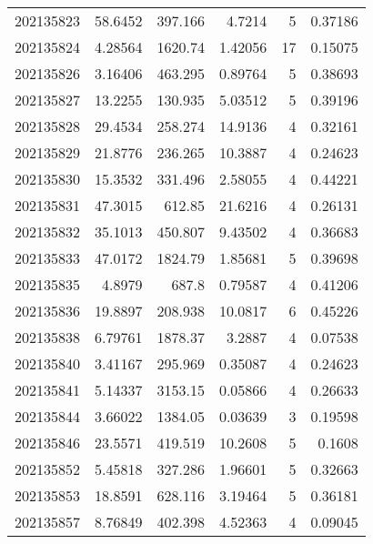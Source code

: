 \begin{tabular}{rrrrrr}
 202135823 &         58.6452  &      397.166  &            4.7214  &           5 & 0.37186 \\
 202135824 &          4.28564 &     1620.74   &            1.42056 &          17 & 0.15075 \\
 202135826 &          3.16406 &      463.295  &            0.89764 &           5 & 0.38693 \\
 202135827 &         13.2255  &      130.935  &            5.03512 &           5 & 0.39196 \\
 202135828 &         29.4534  &      258.274  &           14.9136  &           4 & 0.32161 \\
 202135829 &         21.8776  &      236.265  &           10.3887  &           4 & 0.24623 \\
 202135830 &         15.3532  &      331.496  &            2.58055 &           4 & 0.44221 \\
 202135831 &         47.3015  &      612.85   &           21.6216  &           4 & 0.26131 \\
 202135832 &         35.1013  &      450.807  &            9.43502 &           4 & 0.36683 \\
 202135833 &         47.0172  &     1824.79   &            1.85681 &           5 & 0.39698 \\
 202135835 &          4.8979  &      687.8    &            0.79587 &           4 & 0.41206 \\
 202135836 &         19.8897  &      208.938  &           10.0817  &           6 & 0.45226 \\
 202135838 &          6.79761 &     1878.37   &            3.2887  &           4 & 0.07538 \\
 202135840 &          3.41167 &      295.969  &            0.35087 &           4 & 0.24623 \\
 202135841 &          5.14337 &     3153.15   &            0.05866 &           4 & 0.26633 \\
 202135844 &          3.66022 &     1384.05   &            0.03639 &           3 & 0.19598 \\
 202135846 &         23.5571  &      419.519  &           10.2608  &           5 & 0.1608  \\
 202135852 &          5.45818 &      327.286  &            1.96601 &           5 & 0.32663 \\
 202135853 &         18.8591  &      628.116  &            3.19464 &           5 & 0.36181 \\
 202135857 &          8.76849 &      402.398  &            4.52363 &           4 & 0.09045 \\

\end{tabular}
